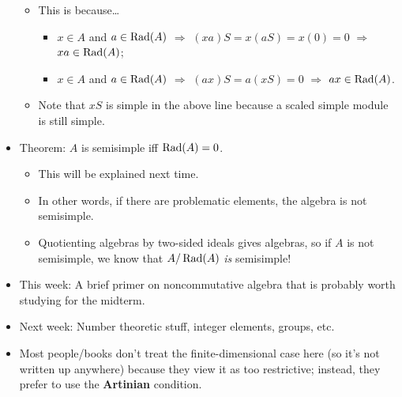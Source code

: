 \documentclass[../notes.tex]{subfiles}
\begin{document}
\begin{itemize}
\begin{itemize}
        \item This is because\dots
        \begin{itemize}
            \item $x\in A$ and $a\in\operatorname{Rad}(A)$ $\Longrightarrow$ $(xa)S=x(aS)=x(0)=0$ $\Longrightarrow$ $xa\in\operatorname{Rad}(A)$;
            \item $x\in A$ and $a\in\operatorname{Rad}(A)$ $\Longrightarrow$ $(ax)S=a(xS)=0$ $\Longrightarrow$ $ax\in\operatorname{Rad}(A)$.
        \end{itemize}
        \item Note that $xS$ is simple in the above line because a scaled simple module is still simple.
    \end{itemize}
    \item Theorem: $A$ is semisimple iff $\operatorname{Rad}(A)=0$.
    \begin{itemize}
        \item This will be explained next time.
        \item In other words, if there are problematic elements, the algebra is not semisimple.
        \item Quotienting algebras by two-sided ideals gives algebras, so if $A$ is not semisimple, we know that $A/\operatorname{Rad}(A)$ \emph{is} semisimple!
    \end{itemize}
    \item This week: A brief primer on noncommutative algebra that is probably worth studying for the midterm.
    \item Next week: Number theoretic stuff, integer elements, groups, etc.
    \item Most people/books don't treat the finite-dimensional case here (so it's not written up anywhere) because they view it as too restrictive; instead, they prefer to use the \textbf{Artinian} condition.
\end{itemize}
\end{document}
